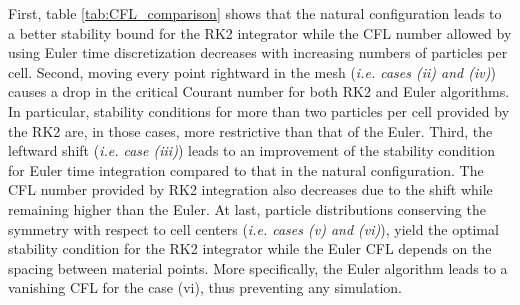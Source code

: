 First, table \ref{tab:CFL_comparison} shows that the natural configuration leads to a better stability bound for the RK2 integrator while the CFL number allowed by using Euler time discretization decreases with increasing numbers of particles per cell.
Second, moving every point rightward in the mesh (\textit{i.e. cases (ii) and (iv)}) causes a drop in the critical Courant number for both RK2 and Euler algorithms. In particular, stability conditions for more than two particles per cell provided by the RK2 are, in those cases, more restrictive than that of the Euler.
Third, the leftward shift (\textit{i.e. case (iii)}) leads to an improvement of the stability condition for Euler time integration compared to that in the natural configuration.
The CFL number provided by RK2 integration also decreases due to the shift while remaining higher than the Euler.
At last, particle distributions conserving the symmetry with respect to cell centers (\textit{i.e. cases (v) and (vi)}), yield the optimal stability condition for the RK2 integrator while the Euler CFL depends on the spacing between material points.
More specifically, the Euler algorithm leads to a vanishing CFL for the case (vi), thus preventing any simulation.

